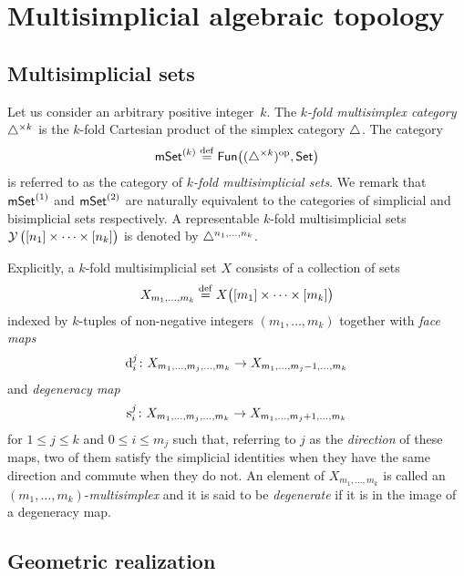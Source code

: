
\section{Multisimplicial algebraic topology}\label{s:multisimplicial}

\subsection{Multisimplicial sets}\label{ss:multisimplicial sets}

Let us consider an arbitrary positive integer~$k$.
The \textit{$k$-fold multisimplex category} $\triangle^{\times k}$ is the $k$-fold Cartesian product of the simplex category $\triangle$.
The category
\[
\mathsf{mSet}^{(k)} \stackrel{\mathrm{def}}{=} \mathsf{Fun}\big((\triangle^{\times k})^{\mathrm{op}}, \mathsf{Set}\big)
\]
is referred to as the category of \textit{$k$-fold multisimplicial sets}.
We remark that $\mathsf{mSet}^{(1)}$ and $\mathsf{mSet}^{(2)}$ are naturally equivalent to the categories of simplicial and bisimplicial sets respectively.
A representable $k$-fold multisimplicial sets $\operatorname{\mathcal{Y}} \big([n_1]\times\dots\times[n_k]\big)$ is denoted by $\triangle^{n_1,\dots,n_k}$.

Explicitly, a $k$-fold multisimplicial set $X$ consists of a collection of sets
\[
X_{m_1,\dots,m_k} \stackrel{\mathrm{def}}{=}
X \big( [m_1] \times\dots\times [m_k] \big)
\]
indexed by $k$-tuples of non-negative integers $(m_1,\dots,m_k)$ together with \textit{face maps}
\[
\operatorname{d}_i^j \colon
X_{m_1, \dots, m_j,\dots,m_k} \to
X_{m_1, \dots, m_j-1, \dots, m_k}
\]
and \textit{degeneracy map}
\[
\operatorname{s}^j_i \colon X_{m_1, \dots, m_j,\dots,m_k} \to X_{m_1, \dots, m_j+1, \dots, m_k}
\]
for $1 \leq j \leq k$ and $0 \leq i \leq m_j$ such that, referring to $j$ as the \textit{direction} of these maps, two of them satisfy the simplicial identities when they have the same direction and commute when they do not.
An element of $X_{m_1,\dots,m_k}$ is called an $(m_1,\dots,m_k)$-\textit{multisimplex} and it is said to be \textit{degenerate} if it is in the image of a degeneracy map.


\subsection{Geometric realization}\label{ss:geometric realization}

